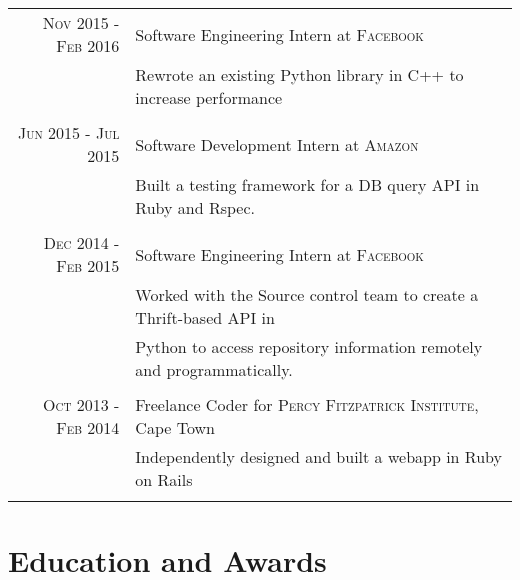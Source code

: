 \documentclass[a4paper,10pt]{article} %
\begin{document}
\begin{tabular}{r|p{11cm}}
\textsc{Nov 2015 - Feb 2016} & Software Engineering Intern at \textsc{Facebook} \emph{}\\
& \footnotesize{Rewrote an existing Python library in C++ to increase performance}\\
\multicolumn{2}{c}{} \\

\textsc{Jun 2015 - Jul 2015} & Software Development Intern at \textsc{Amazon} \emph{}\\
& \footnotesize{Built a testing framework for a DB query API in Ruby and Rspec.}\\
\multicolumn{2}{c}{} \\

\textsc{Dec 2014 - Feb 2015} & Software Engineering Intern at \textsc{Facebook} \emph{}\\
& \footnotesize{Worked with the Source control team to create a Thrift-based API in}\\
& \footnotesize{Python to access repository information remotely and programmatically.}\\
\multicolumn{2}{c}{} \\




\textsc{Oct 2013 - Feb 2014} & Freelance Coder for \textsc{Percy Fitzpatrick Institute}, Cape Town \emph{}\\
& \footnotesize{Independently designed and built a webapp in Ruby on Rails}\\
\multicolumn{2}{c}{} \\


\end{tabular}


\section{Education and Awards}
\end{document}
